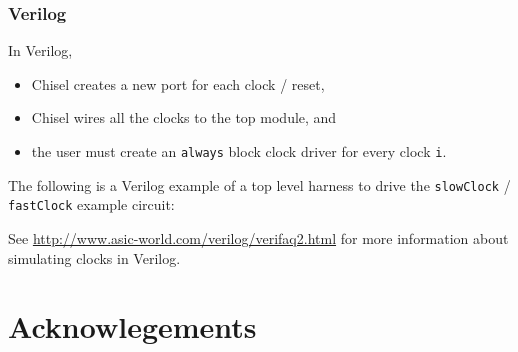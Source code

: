 \documentclass[twocolumn,10pt]{article}
\begin{document}
\subsubsection{Verilog}

In Verilog, 

\begin{itemize}
\item Chisel creates a new port for each clock / reset,
\item Chisel wires all the clocks to the top module, and
\item the user must create an \verb+always+ block clock driver for every clock \verb+i+.
\end{itemize}

\noindent
The following is a Verilog example of a top level harness to drive the  \verb+slowClock+ / \verb+fastClock+ example circuit:


\noindent
See \url{http://www.asic-world.com/verilog/verifaq2.html} for more information about simulating clocks in Verilog.

\section{Acknowlegements}
\end{document}
